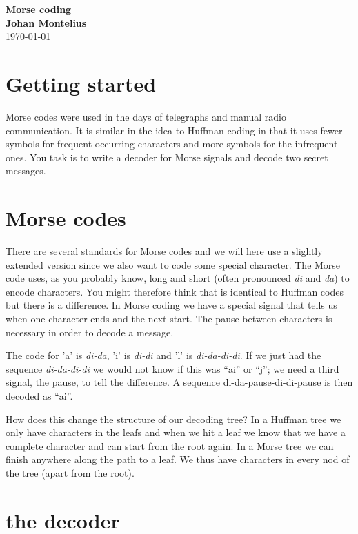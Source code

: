 \documentclass[a4paper,11pt]{article}
\newcommand{\nnsection}[1]{
\section*{#1}
\addcontentsline{toc}{section}{#1}
}
\begin{document}
\begin{center}
\vspace{20pt}
\textbf{\large Morse coding}\\
\vspace{10pt}
\textbf{Johan Montelius}\\
\vspace{10pt}
\today{}
\end{center}


\nnsection{Getting started}

Morse codes were used in the days of telegraphs and manual radio
communication. It is similar in the idea to Huffman coding in that it
uses fewer symbols for frequent occurring characters and more symbols
for the infrequent ones. You task is to write a decoder for Morse
signals and decode two secret messages. 

\section{Morse codes}

There are several standards for Morse codes and we will here use a
slightly extended version since we also want to code some special
character. The Morse code uses, as you probably know, long and short
(often pronounced {\em di} and {\em da}) to encode characters. You
might therefore think that is identical to Huffman codes but there is
a difference. In Morse coding we have a special signal that tells us
when one character ends and the next start. The pause between
characters is necessary in order to decode a message.

The code for 'a' is {\em di-da}, 'i' is {\em di-di} and 'l' is {\em di-da-di-di}.  If
we just had the sequence {\em di-da-di-di} we would not know if this
was ``ai'' or ``j''; we need a third signal, the pause, to tell the
difference. A sequence {di-da-pause-di-di-pause} is then decoded as ``ai''.

How does this change the structure of our decoding tree? In a Huffman
tree we only have characters in the leafs and when we hit a leaf we
know that we have a complete character and can start from the root
again. In a Morse tree we can finish anywhere along the path to a
leaf. We thus have characters in every nod of the tree (apart from the
root).

\section{the decoder}
\end{document}
